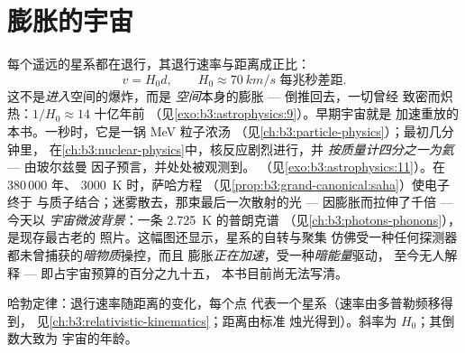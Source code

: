 \section{膨胀的宇宙}

\begin{definition}[哈勃定律与炽热的开端]\label{def:b3:astrophysics:hubble}
每个遥远的星系都在退行，其退行速率与距离成正比：
\[
v = H_0d , \qquad H_0 \approx \qty{70}{km/s}
\text{ 每兆秒差距} .
\]
这不是\emph{进入}空间的爆炸，而是
\emph{空间}本身的膨胀 --- 倒推回去，一切曾经
致密而炽热：$1/H_0 \approx 14$ 十亿年前
（见\cref{exo:b3:astrophysics:9}）。早期宇宙就是
加速重放的本书。一秒时，它是一锅 \unit{MeV} 粒子浓汤
（见\cref{ch:b3:particle-physics}）；最初几分钟里，
在\cref{ch:b3:nuclear-physics}中，核反应剧烈进行，并
\emph{按质量计四分之一为氦} --- 由玻尔兹曼
因子预言，并处处被观测到。
（见\cref{exo:b3:astrophysics:11}）。在 380\,000 年、
\qty{3000}{K} 时，萨哈方程
（见\cref{prop:b3:grand-canonical:saha}）使电子终于
与质子结合；迷雾散去，那束最后一次散射的光 ---
因膨胀而拉伸了千倍 --- 今天以
\emph{宇宙微波背景}：一条 \qty{2.725}{K} 的普朗克谱
（见\cref{ch:b3:photons-phonons}），是现存最古老的
照片。这幅图还显示，星系的自转与聚集
仿佛受一种任何探测器都未曾捕获的\emph{暗物质}操控，而且
膨胀\emph{正在加速}，受一种\emph{暗能量}驱动，
至今无人解释 --- 即占宇宙预算的百分之九十五，
本书目前尚无法写清。
\end{definition}

\begin{omfigure}

{\small 哈勃定律：退行速率随距离的变化，每个点
代表一个星系（速率由多普勒频移得到，
见\cref{ch:b3:relativistic-kinematics}；距离由标准
烛光得到）。斜率为 $H_0$；其倒数大致为
宇宙的年龄。}
\end{omfigure}

